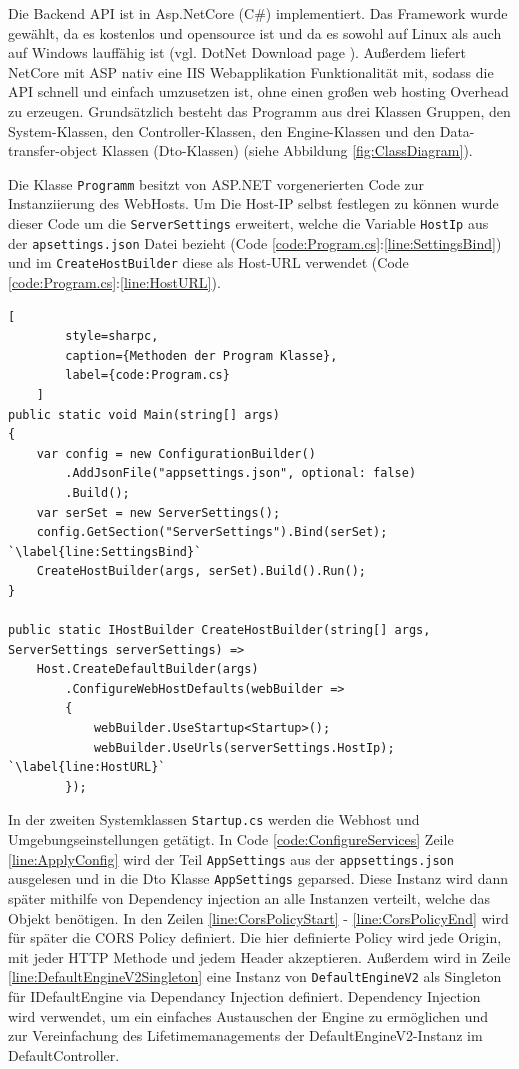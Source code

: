 Die Backend API ist in Asp.NetCore (C\#) implementiert.
Das Framework wurde gewählt, da es kostenlos und opensource
ist und da es sowohl auf Linux als auch auf Windows lauffähig ist
(vgl. DotNet Download page \cite{DotNetDownloadPage}).
Außerdem liefert NetCore mit ASP nativ eine IIS Webapplikation
Funktionalität mit, sodass die API schnell und einfach umzusetzen ist,
ohne einen großen web hosting Overhead zu erzeugen. Grundsätzlich
besteht das Programm aus drei Klassen Gruppen, den System-Klassen,
den Controller-Klassen, den Engine-Klassen und den Data-transfer-object
Klassen (Dto-Klassen) (siehe Abbildung \ref{fig:ClassDiagram}).

Die Klasse \texttt{Programm} besitzt von ASP.NET vorgenerierten Code zur Instanziierung
des WebHosts. Um Die Host-IP selbst festlegen zu können wurde dieser
Code um die \texttt{ServerSettings} erweitert, welche die Variable \texttt{HostIp} aus der
\texttt{apsettings.json} Datei bezieht
(Code \ref{code:Program.cs}:\ref{line:SettingsBind}) und im
\texttt{CreateHostBuilder} diese als Host-URL verwendet
(Code \ref{code:Program.cs}:\ref{line:HostURL}).

\begin{codeblock}
	\begin{lstlisting}[
		style=sharpc,
		caption={Methoden der Program Klasse},
		label={code:Program.cs}
	]
public static void Main(string[] args)
{
	var config = new ConfigurationBuilder()
		.AddJsonFile("appsettings.json", optional: false)
		.Build();
	var serSet = new ServerSettings();
	config.GetSection("ServerSettings").Bind(serSet); `\label{line:SettingsBind}`
	CreateHostBuilder(args, serSet).Build().Run();
}

public static IHostBuilder CreateHostBuilder(string[] args, ServerSettings serverSettings) =>
	Host.CreateDefaultBuilder(args)
		.ConfigureWebHostDefaults(webBuilder =>
		{
			webBuilder.UseStartup<Startup>();
			webBuilder.UseUrls(serverSettings.HostIp); `\label{line:HostURL}`
		});
	\end{lstlisting}
\end{codeblock}

In der zweiten Systemklassen \texttt{Startup.cs} werden die
Webhost und Umgebungseinstellungen getätigt.
In Code \ref{code:ConfigureServices} Zeile \ref{line:ApplyConfig}
wird der Teil \texttt{AppSettings} aus der
\texttt{appsettings.json} ausgelesen und in die Dto Klasse
\texttt{AppSettings} geparsed. Diese Instanz wird dann später
mithilfe von Dependency injection an alle Instanzen verteilt,
welche das Objekt benötigen. In den Zeilen \ref{line:CorsPolicyStart}
- \ref{line:CorsPolicyEnd} wird für später die CORS Policy definiert.
Die hier definierte Policy wird jede Origin, mit jeder HTTP Methode
und jedem Header akzeptieren. Außerdem wird in Zeile
\ref{line:DefaultEngineV2Singleton} eine Instanz von \texttt{DefaultEngineV2}
als Singleton für IDefaultEngine via Dependancy Injection definiert.
Dependency Injection wird verwendet, um ein einfaches Austauschen der
Engine zu ermöglichen und zur Vereinfachung des Lifetimemanagements
der DefaultEngineV2-Instanz im DefaultController.

